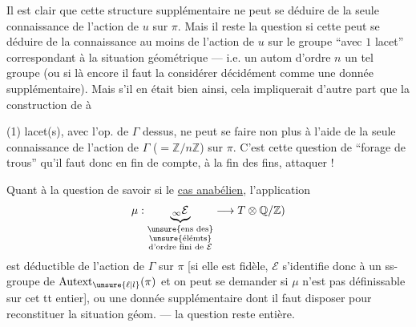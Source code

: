 Il est clair que cette structure supplémentaire ne peut se déduire
de la seule connaissance de l'action de \(u\) sur \(\pi\).
Mais il reste la question si cette 
peut se déduire de la connaissance au moins de l'action
 de \(u\) sur le groupe
``avec \(1\) lacet'' correspondant à la situation géométrique
--- i.e. un autom 
 d'ordre \(n\)  un tel groupe
(ou si là encore il faut la considérer décidément comme une donnée
supplémentaire).
Mais s'il en était bien ainsi, cela impliquerait d'autre part que la
construction de  à



(1) lacet(s), avec l'op. de \(\Gamma\) dessus, ne peut se faire non
plus à l'aide de la seule 
connaissance de l'action de \(\Gamma\) (\(=\mathbb Z/n\mathbb Z\))
sur \(\pi\).
C'est cette question de ``forage de trous'' qu'il faut donc en fin de
compte, à la fin des fins, attaquer !

Quant à la question de savoir si
 le \uline{cas anabélien},
l'application
\[
\mu:\underbrace{{}_\infty\mathcal E}_{
\substack{\text{\unsure{ens des}}\\
\text{\unsure{élémts}}\\
\text{d'ordre fini de }\mathcal E}}
\longrightarrow T\otimes\mathbb Q/\mathbb Z)
\]
est déductible de l'action de \(\Gamma\) sur \(\pi\)
[si elle est fidèle, \(\mathcal E\) s'identifie donc à un ss-groupe
de \(\operatorname{Autext}_{\unsure{\ell|l}}(\pi)\)
et on peut se demander si \(\mu\) n'est pas
 définissable sur cet tt entier],
ou  une donnée supplémentaire dont il faut disposer pour
reconstituer la situation géom. --- la question reste entière.

